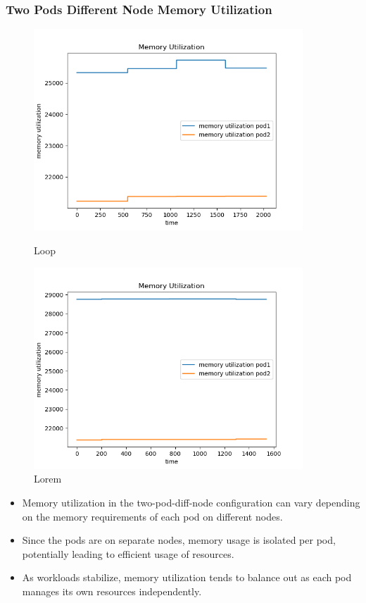 \subsubsection{Two Pods Different Node Memory Utilization}
\begin{figure}[h]
    \begin{minipage}[t]{0.5\textwidth}
        \centering
        \includegraphics[width=0.9\textwidth]{../sample_results/loop/two-pod-diff-node/mem-utilization-two-pod-diff-node.png}
        \caption{Loop}
    \end{minipage}
    \hfill
    \begin{minipage}[t]{0.5\textwidth}
        \centering
        \includegraphics[width=0.9\textwidth]{../sample_results/lorem/two-pod-diff-node/mem-utilization-two-pod-diff-node.png}
        \caption{Lorem}
    \end{minipage}
\end{figure}

\begin{itemize}
    \item Memory utilization in the two-pod-diff-node configuration can vary depending on the memory requirements of each pod on different nodes.
    \item Since the pods are on separate nodes, memory usage is isolated per pod, potentially leading to efficient usage of resources.
    \item As workloads stabilize, memory utilization tends to balance out as each pod manages its own resources independently.
\end{itemize}

